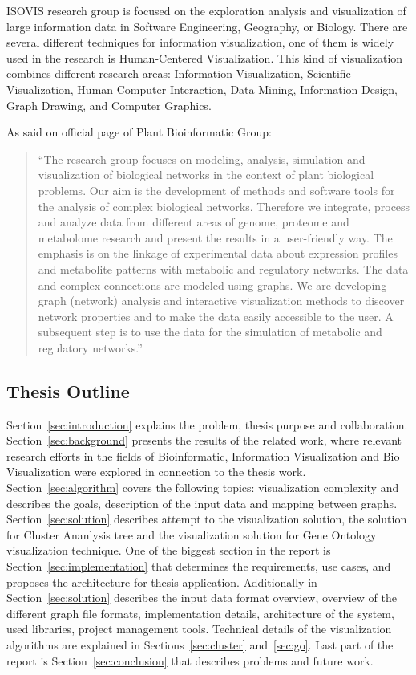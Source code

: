 ISOVIS research group is focused on the exploration analysis and visualization of large information data in Software Engineering, Geography, or Biology. There are several different techniques for information visualization, one of them is widely used in the research is Human-Centered Visualization. This kind of visualization combines different research areas: Information Visualization, Scientific Visualization, Human-Computer Interaction, Data Mining, Information Design, Graph Drawing, and Computer Graphics.


As said on official page of Plant Bioinformatic Group:
\begin{quotation}
``The research group focuses on modeling, analysis, simulation and visualization of biological networks in the context of plant biological problems.
Our aim is the development of methods and software tools for the analysis of complex biological networks.
Therefore we integrate, process and analyze data from different areas of genome, proteome and metabolome research and present the results in a user-friendly way.
The emphasis is on the linkage of experimental data about expression profiles and metabolite patterns with metabolic and regulatory networks.
The data and complex connections are modeled using graphs. We are developing graph (network) analysis and interactive visualization methods to discover network properties and to make the data easily accessible to the user.
A subsequent step is to use the data for the simulation of metabolic and regulatory networks.''~\cite{PBG}
\end{quotation}


\subsection{Thesis Outline}
\label{sec:structure}

Section~\ref{sec:introduction} explains the problem, thesis purpose and collaboration. Section~\ref{sec:background} presents the results of the related work, where relevant research efforts in the fields of Bioinformatic, Information Visualization and Bio Visualization were explored in connection to the thesis work. Section~\ref{sec:algorithm} covers the following topics: visualization complexity and describes the goals, description of the input data and mapping between graphs. Section~\ref{sec:solution} describes attempt to the visualization solution, the solution for Cluster Ananlysis tree and the visualization solution for Gene Ontology visualization technique. One of the biggest section in the report is Section~\ref{sec:implementation} that determines the requirements, use cases, and proposes the architecture for thesis application.
Additionally in Section~\ref{sec:solution} describes the input data format overview, overview of the different graph file formats, implementation details, architecture of the system, used libraries, project management tools. Technical details of the visualization algorithms are explained in Sections~\ref{sec:cluster} and~\ref{sec:go}. Last part of the report is Section~\ref{sec:conclusion} that describes problems and future work.

